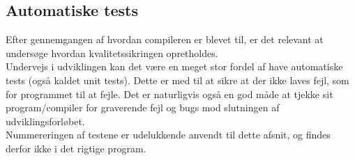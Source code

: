 \subsection{Automatiske tests}
Efter gennemgangen af hvordan compileren er blevet til, er det relevant at undersøge hvordan kvalitetssikringen opretholdes. \\

\noindent Undervejs i udviklingen kan det være en meget stor fordel af have automatiske tests (også kaldet unit tests). Dette er med til at sikre at der ikke laves fejl, som for programmet til at fejle. Det er naturligvis også en god måde at tjekke sit program/compiler for graverende fejl og bugs mod slutningen af udviklingsforløbet.\\

\noindent Nummereringen af testene er udelukkende anvendt til dette afsnit, og findes derfor ikke i det rigtige program.

